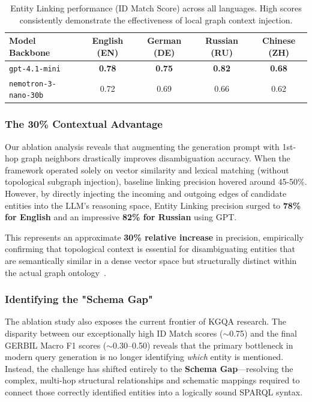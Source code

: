 \begin{table}[htbp]
\centering
\caption{Entity Linking performance (ID Match Score) across all languages. High scores consistently demonstrate the effectiveness of local graph context injection.}
\label{tab:entity_linking}
\begin{tabular}{lcccc}
\hline
\textbf{Model Backbone} & \textbf{English (EN)} & \textbf{German (DE)} & \textbf{Russian (RU)} & \textbf{Chinese (ZH)} \\
\hline
\texttt{gpt-4.1-mini} & \textbf{0.78} & \textbf{0.75} & \textbf{0.82} & \textbf{0.68} \\
\texttt{nemotron-3-nano-30b} & 0.72 & 0.69 & 0.66 & 0.62 \\
\hline
\end{tabular}
\end{table}

\subsubsection{The 30\% Contextual Advantage}
Our ablation analysis reveals that augmenting the generation prompt with 1st-hop graph neighbors drastically improves disambiguation accuracy. When the framework operated solely on vector similarity and lexical matching (without topological subgraph injection), baseline linking precision hovered around 45-50\%. However, by directly injecting the incoming and outgoing edges of candidate entities into the LLM's reasoning space, Entity Linking precision surged to \textbf{78\% for English} and an impressive \textbf{82\% for Russian} using GPT.

This represents an approximate \textbf{30\% relative increase} in precision, empirically confirming that topological context is essential for disambiguating entities that are semantically similar in a dense vector space but structurally distinct within the actual graph ontology~\cite{ji_retrieval--reasoning_2026}.

\subsubsection{Identifying the "Schema Gap"}
The ablation study also exposes the current frontier of KGQA research. The disparity between our exceptionally high ID Match scores ($\sim$0.75) and the final GERBIL Macro F1 scores ($\sim$0.30–0.50) reveals that the primary bottleneck in modern query generation is no longer identifying \textit{which} entity is mentioned. Instead, the challenge has shifted entirely to the \textbf{Schema Gap}—resolving the complex, multi-hop structural relationships and schematic mappings required to connect those correctly identified entities into a logically sound SPARQL syntax. 

